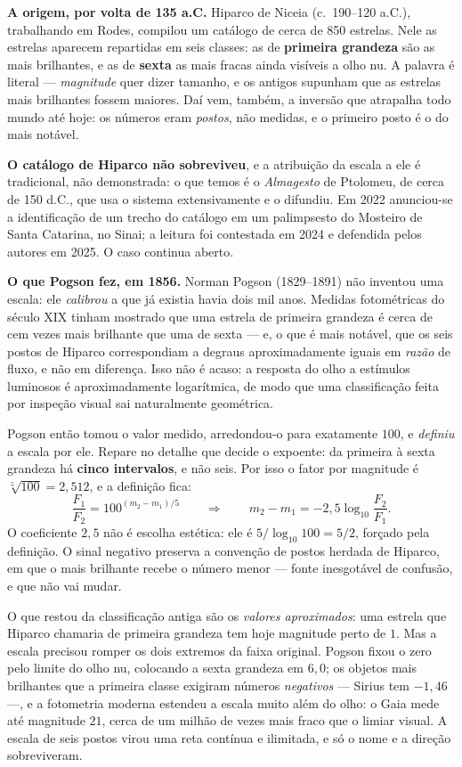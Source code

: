 \documentclass[11pt,a4paper]{article}
\begin{document}
\textbf{A origem, por volta de 135 a.C.} Hiparco de Niceia (c.\ 190--120 a.C.), trabalhando em Rodes, compilou um catálogo de cerca de 850 estrelas. Nele as estrelas aparecem repartidas em seis classes: as de \textbf{primeira grandeza} são as mais brilhantes, e as de \textbf{sexta} as mais fracas ainda visíveis a olho nu. A palavra é literal --- \emph{magnitude} quer dizer tamanho, e os antigos supunham que as estrelas mais brilhantes fossem maiores. Daí vem, também, a inversão que atrapalha todo mundo até hoje: os números eram \emph{postos}, não medidas, e o primeiro posto é o do mais notável.

\textbf{O catálogo de Hiparco não sobreviveu}, e a atribuição da escala a ele é tradicional, não demonstrada: o que temos é o \textit{Almagesto} de Ptolomeu, de cerca de 150 d.C., que usa o sistema extensivamente e o difundiu. Em 2022 anunciou-se a identificação de um trecho do catálogo em um palimpsesto do Mosteiro de Santa Catarina, no Sinai; a leitura foi contestada em 2024 e defendida pelos autores em 2025. O caso continua aberto.

\textbf{O que Pogson fez, em 1856.} Norman Pogson (1829--1891) não inventou uma escala: ele \emph{calibrou} a que já existia havia dois mil anos. Medidas fotométricas do século XIX tinham mostrado que uma estrela de primeira grandeza é cerca de cem vezes mais brilhante que uma de sexta --- e, o que é mais notável, que os seis postos de Hiparco correspondiam a degraus aproximadamente iguais em \emph{razão} de fluxo, e não em diferença. Isso não é acaso: a resposta do olho a estímulos luminosos é aproximadamente logarítmica, de modo que uma classificação feita por inspeção visual sai naturalmente geométrica.

Pogson então tomou o valor medido, arredondou-o para exatamente $100$, e \emph{definiu} a escala por ele. Repare no detalhe que decide o expoente: da primeira à sexta grandeza há \textbf{cinco intervalos}, e não seis. Por isso o fator por magnitude é $\sqrt[5]{100}=2{,}512$, e a definição fica:
\[
\frac{F_1}{F_2}=100^{(m_2-m_1)/5}
\qquad\Longrightarrow\qquad
m_2-m_1=-2{,}5\log_{10}\frac{F_2}{F_1}.
\]
O coeficiente $2{,}5$ não é escolha estética: ele é $5/\log_{10}100=5/2$, forçado pela definição. O sinal negativo preserva a convenção de postos herdada de Hiparco, em que o mais brilhante recebe o número menor --- fonte inesgotável de confusão, e que não vai mudar.

O que restou da classificação antiga são os \emph{valores aproximados}: uma estrela que Hiparco chamaria de primeira grandeza tem hoje magnitude perto de $1$. Mas a escala precisou romper os dois extremos da faixa original. Pogson fixou o zero pelo limite do olho nu, colocando a sexta grandeza em $6{,}0$; os objetos mais brilhantes que a primeira classe exigiram números \emph{negativos} --- Sirius tem $-1{,}46$ ---, e a fotometria moderna estendeu a escala muito além do olho: o Gaia mede até magnitude $21$, cerca de um milhão de vezes mais fraco que o limiar visual. A escala de seis postos virou uma reta contínua e ilimitada, e só o nome e a direção sobreviveram.
\end{document}

